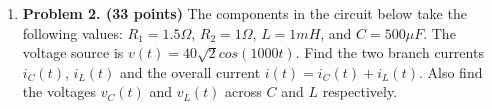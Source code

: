 \begin{enumerate}
\begin{comment}
    \htmladdimg{../../lectures/figures/Problems10.png}

  \item ({\bf 11 pts})
    In the figure above, it is know that $R=10\Omega$, $L=100\,mH$,
    and $C=500\,\mu F$, and the current through the loop is known to be
    $i(t)=\cos(100\,t)\,A$, find all four voltages $v_0(t)$, $v_1(t)$, 
    $v_2(t)$, and $v_3(t)$.

    {\bf Solution:} 
    $V_0=5$. $V_1=V_2=0$, $V_3=10$.

    \[
    \left\{\begin{array}{lll}
    v_1(t)=R i(t)=10\cos(100\,t)\\
    v_2(t)=Z_L i(t)=j\omega L i(t)=100\times 0.1 \cos(100\,t+\pi/2)=10\cos(100\,t+\pi/2)\\
    v_3(t)=Z_C i(t)=1/(j\omega C) i(t)=1/(100\times 500\times 10^{-6})\cos(100\,t)=20\cos(100,\,t-\pi/2)
    \end{array}\right.
    \]
    \[
    V_0=V_1+V_2+V_3=10+10\angle\pi/2+20\angle(-\pi/2)=10+10\angle(-\pi/2)
    \]
    \[
    v_0(t)=10\sqrt{2}\cos(100t-\pi/4)
    \]

  \item ({\bf 11 pts})
    The RMS values of the three currents through R, L, and C measured 
    by the three ammeters $A_1$, $A_2$, and $A_3$ are $I_1=4\,A$, $I_2=5\,A$, 
    and $I_3=2\,A$, respectively. Find the RMS value of the source current 
    $I_0$. If the AC voltage source is replaced by a DC current source 
    $I_0=1\,A$, Find the three currents $I_1$, $I_2$, and $I_3$ measured 
    respectively by ammeters $A_1$, $A_2$, and $A_3$.

    \htmladdimg{../../lectures/figures/Problems11.png}

    {\bf Solution:} $I_0=5$. $I_2=1$, $I_1=I_3=0$.
    

  \end{itemize}
\end{comment}

\item {\bf Problem 2. (33 points)} 
  The components in the circuit below take the following values:
  $R_1=1.5\Omega$, $R_2=1\Omega$, $L=1mH$, and $C=500\mu F$. The voltage
  source is $v(t)=40\sqrt{2} cos(1000t)$. Find the two branch currents 
  $i_C(t)$, $i_L(t)$ and the overall current $i(t)=i_C(t)+i_L(t)$.
  Also find the voltages $v_C(t)$ and $v_L(t)$ across $C$ and $L$
  respectively.



\end{enumerate}
